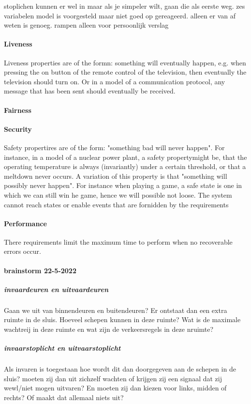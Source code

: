 {{{{{{{{{stoplichen kunnen er wel in maar als je simpeler wilt, gaan die als eerste weg.
zes variabelen model is voorgesteld maar niet goed op gereageerd. alleen er van af weten is genoeg.
rampen alleen voor persoonlijk verslag






\paragraph{Liveness}
Liveness properties are of the formn: something will eventually happen, e.g. when pressing the on button of the remote control of the television, then eventually the television should turn on. Or in a model of a  communication protocol, any message that has been sent should eventually be received.
\paragraph{Fairness}
\paragraph{Security}
Safety propertires are of the form: "something bad will never happen". For instance, in a model of a nuclear power plant, a safety propertymight be, that the operating temperature is always (invariantly) under a certain threshold, or that a meltdown never occurs. A variation of this property is that "something will possibly never happen".
For instance when playing a game, a safe state is one in which we can still win he game, hence we will possible not loose.
The system cannot reach states or enable events that are fornidden by the requirements
\paragraph{Performance}
There requirements limit the maximum time to perform when no recoverable errors occur.



\paragraph{brainstorm 22-5-2022}

\subparagraph{invaardeuren en uitvaardeuren}
Gaan we uit van binnendeuren en buitendeuren? Er ontstaat dan een extra ruimte in de sluis. Hoeveel schepen kunnen in deze ruimte? Wat is de maximale wachtreij in deze ruimte en wat zijn de verkeersregels in deze nruimte?
\subparagraph{invaarstoplicht en uitvaarstoplicht}
Als invaren is toegestaan hoe wordt dit dan doorgegeven aan de schepen in de sluis? moeten zij dan uit zichzelf wachten of krijgen zij een signaal dat zij wewl/niet mogen uitvaren? En moeten zij dan kiezen voor links, midden of rechts? Of maakt dat allemaal niets uit?

}}}}}}}}}
